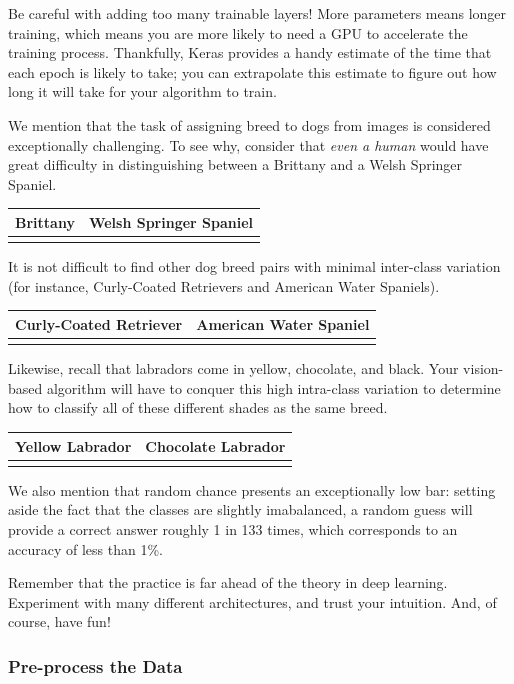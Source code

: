 \documentclass[11pt]{article}
\begin{document}
Be careful with adding too many trainable layers! More parameters means
longer training, which means you are more likely to need a GPU to
accelerate the training process. Thankfully, Keras provides a handy
estimate of the time that each epoch is likely to take; you can
extrapolate this estimate to figure out how long it will take for your
algorithm to train.

We mention that the task of assigning breed to dogs from images is
considered exceptionally challenging. To see why, consider that
\emph{even a human} would have great difficulty in distinguishing
between a Brittany and a Welsh Springer Spaniel.

\begin{longtable}[]{@{}ll@{}}
\toprule
Brittany & Welsh Springer Spaniel\tabularnewline
\midrule
\endhead
&\tabularnewline
\bottomrule
\end{longtable}

It is not difficult to find other dog breed pairs with minimal
inter-class variation (for instance, Curly-Coated Retrievers and
American Water Spaniels).

\begin{longtable}[]{@{}ll@{}}
\toprule
Curly-Coated Retriever & American Water Spaniel\tabularnewline
\midrule
\endhead
&\tabularnewline
\bottomrule
\end{longtable}

Likewise, recall that labradors come in yellow, chocolate, and black.
Your vision-based algorithm will have to conquer this high intra-class
variation to determine how to classify all of these different shades as
the same breed.

\begin{longtable}[]{@{}ll@{}}
\toprule
Yellow Labrador & Chocolate Labrador\tabularnewline
\midrule
\endhead
&\tabularnewline
\bottomrule
\end{longtable}

We also mention that random chance presents an exceptionally low bar:
setting aside the fact that the classes are slightly imabalanced, a
random guess will provide a correct answer roughly 1 in 133 times, which
corresponds to an accuracy of less than 1\%.

Remember that the practice is far ahead of the theory in deep learning.
Experiment with many different architectures, and trust your intuition.
And, of course, have fun!

\hypertarget{pre-process-the-data}{%
\subsubsection{Pre-process the Data}\label{pre-process-the-data}}
\end{document}
